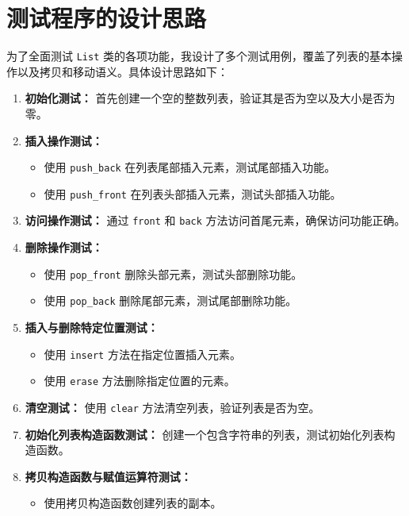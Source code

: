 \documentclass[UTF8]{ctexart}
\begin{document}
\pagestyle{fancy}
\fancyhead{}

\section{测试程序的设计思路}

为了全面测试 \texttt{List} 类的各项功能，我设计了多个测试用例，覆盖了列表的基本操作以及拷贝和移动语义。具体设计思路如下：

\begin{enumerate}
    \item \textbf{初始化测试：} 首先创建一个空的整数列表，验证其是否为空以及大小是否为零。
    \item \textbf{插入操作测试：} 
    \begin{itemize}
        \item 使用 \texttt{push\_back} 在列表尾部插入元素，测试尾部插入功能。
        \item 使用 \texttt{push\_front} 在列表头部插入元素，测试头部插入功能。
    \end{itemize}
    \item \textbf{访问操作测试：} 通过 \texttt{front} 和 \texttt{back} 方法访问首尾元素，确保访问功能正确。
    \item \textbf{删除操作测试：} 
    \begin{itemize}
        \item 使用 \texttt{pop\_front} 删除头部元素，测试头部删除功能。
        \item 使用 \texttt{pop\_back} 删除尾部元素，测试尾部删除功能。
    \end{itemize}
    \item \textbf{插入与删除特定位置测试：} 
    \begin{itemize}
        \item 使用 \texttt{insert} 方法在指定位置插入元素。
        \item 使用 \texttt{erase} 方法删除指定位置的元素。
    \end{itemize}
    \item \textbf{清空测试：} 使用 \texttt{clear} 方法清空列表，验证列表是否为空。
    \item \textbf{初始化列表构造函数测试：} 创建一个包含字符串的列表，测试初始化列表构造函数。
    \item \textbf{拷贝构造函数与赋值运算符测试：} 
    \begin{itemize}
        \item 使用拷贝构造函数创建列表的副本。

\end{itemize}
\end{enumerate}
\end{document}
